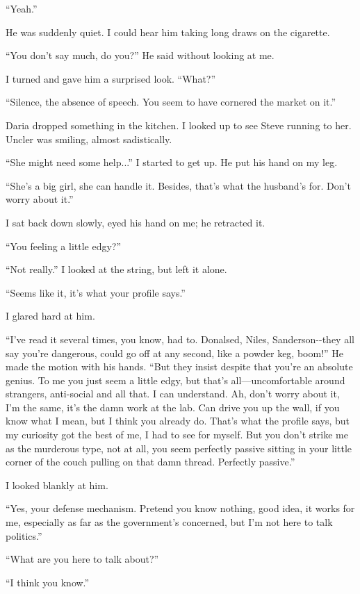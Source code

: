 ``Yeah.''

He was suddenly quiet. I could hear him taking long draws on the
cigarette.

``You don't say much, do you?'' He said without looking at me.

I turned and gave him a surprised look. ``What?''

``Silence, the absence of speech. You seem to have cornered the market
on it.''

Daria dropped something in the kitchen. I looked up to see Steve running
to her. Uncler was smiling, almost sadistically.

``She might need some help...'' I started to get up. He put his hand on
my leg.

``She's a big girl, she can handle it. Besides, that's what the
husband's for. Don't worry about it.''

I sat back down slowly, eyed his hand on me; he retracted it.

``You feeling a little edgy?''

``Not really.'' I looked at the string, but left it alone.

``Seems like it, it's what your profile says.''

I glared hard at him.

``I've read it several times, you know, had to. Donalsed, Niles,
Sanderson-\/-they all say you're dangerous, could go off at any second,
like a powder keg, boom!'' He made the motion with his hands. ``But they
insist despite that you're an absolute genius. To me you just seem a
little edgy, but that's all---uncomfortable around strangers,
anti-social and all that. I can understand. Ah, don't worry about it,
I'm the same, it's the damn work at the lab. Can drive you up the wall,
if you know what I mean, but I think you already do. That's what the
profile says, but my curiosity got the best of me, I had to see for
myself. But you don't strike me as the murderous type, not at all, you
seem perfectly passive sitting in your little corner of the couch
pulling on that damn thread. Perfectly passive.''

I looked blankly at him.

``Yes, your defense mechanism. Pretend you know nothing, good idea, it
works for me, especially as far as the government's concerned, but I'm
not here to talk politics.''

``What are you here to talk about?''

``I think you know.''

